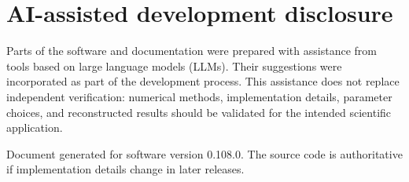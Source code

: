 \documentclass[10pt,a4paper]{article}
\begin{document}
\section{AI-assisted development disclosure}
Parts of the software and documentation were prepared with assistance from tools based on large language models (LLMs). Their suggestions were incorporated as part of the development process. This assistance does not replace independent verification: numerical methods, implementation details, parameter choices, and reconstructed results should be validated for the intended scientific application.

\vfill\begin{center}\small Document generated for software version 0.108.0. The source code is authoritative if implementation details change in later releases.\end{center}
\end{document}
